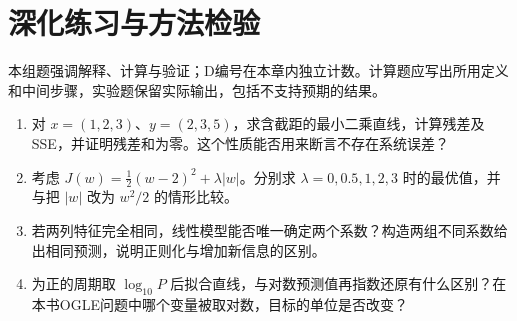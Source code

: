 \section*{深化练习与方法检验}
本组题强调解释、计算与验证；D编号在本章内独立计数。计算题应写出所用定义和中间步骤，实验题保留实际输出，包括不支持预期的结果。
\begin{enumerate}[label=D\arabic*.]
\item 对 $x=(1,2,3)$、$y=(2,3,5)$，求含截距的最小二乘直线，计算残差及SSE，并证明残差和为零。这个性质能否用来断言不存在系统误差？
\item 考虑 $J(w)=\frac12(w-2)^2+\lambda|w|$。分别求 $\lambda=0,0.5,1,2,3$ 时的最优值，并与把 $|w|$ 改为 $w^2/2$ 的情形比较。
\item 若两列特征完全相同，线性模型能否唯一确定两个系数？构造两组不同系数给出相同预测，说明正则化与增加新信息的区别。
\item 为正的周期取 $\log_{10}P$ 后拟合直线，与对数预测值再指数还原有什么区别？在本书OGLE问题中哪个变量被取对数，目标的单位是否改变？
\end{enumerate}
